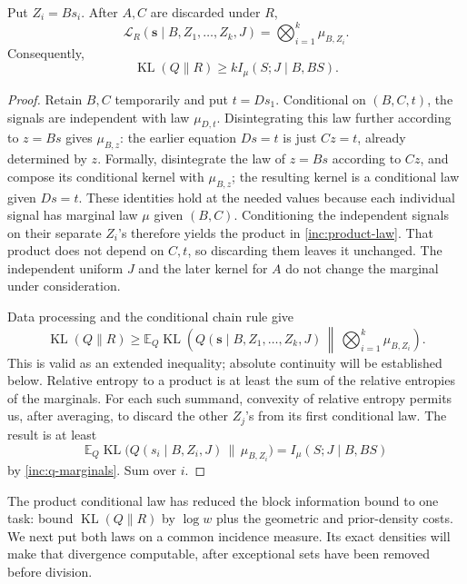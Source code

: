 \begin{lemma}\label{inc:product}
Put \(Z_i=Bs_i\).  After \(A,C\) are discarded under \(R\),
\begin{equation}\label{inc:product-law}
 \mathcal L_R(\mathbf s\mid B,Z_1,\ldots,Z_k,J)
 =\bigotimes_{i=1}^k\mu_{B,Z_i}.
\end{equation}
Consequently,
\begin{equation}\label{inc:entropy-lower}
 \operatorname{KL}(Q\|R)\ge kI_\mu(S;J\mid B,BS).
\end{equation}
\end{lemma}

\begin{proof}
Retain \(B,C\) temporarily and put \(t=Ds_1\).  Conditional on
\((B,C,t)\), the signals are independent with law \(\mu_{D,t}\).
Disintegrating this law further according to \(z=Bs\) gives
\(\mu_{B,z}\): the earlier equation \(Ds=t\) is just \(Cz=t\),
already determined by \(z\).  Formally, disintegrate the law
of \(z=Bs\) according to \(Cz\), and compose its conditional kernel
with \(\mu_{B,z}\); the resulting kernel is a conditional law given
\(Ds=t\).  These identities hold at the needed values because each
individual signal has marginal law \(\mu\) given \((B,C)\).
Conditioning the independent signals on their separate \(Z_i\)'s
therefore yields the product in \eqref{inc:product-law}.  That product
does not depend on \(C,t\), so discarding them leaves it unchanged.
The independent uniform \(J\) and the later kernel for \(A\) do not
change the marginal under consideration.

Data processing and the conditional chain rule give
\[
 \operatorname{KL}(Q\|R)\ge
 \mathbb E_Q\operatorname{KL}\!\left(
 Q(\mathbf s\mid B,Z_1,\ldots,Z_k,J)
 \,\middle\|\,\bigotimes_{i=1}^k\mu_{B,Z_i}\right).
\]
This is valid as an extended inequality; absolute continuity will be
established below.  Relative entropy to a product is at least the sum
of the relative entropies of the marginals.  For each such summand,
convexity of relative entropy permits us, after averaging, to discard
the other \(Z_j\)'s from its first conditional law.  The result is at
least
\[
 \mathbb E_Q\operatorname{KL}\bigl(
 Q(s_i\mid B,Z_i,J)\,\|\,\mu_{B,Z_i}\bigr)
 =I_\mu(S;J\mid B,BS)
\]
by \eqref{inc:q-marginals}.  Sum over \(i\).
\end{proof}

The product conditional law has reduced the block information bound to
one task: bound \(\operatorname{KL}(Q\|R)\) by \(\log w\) plus the
geometric and prior-density costs.  We next put both laws on a common
incidence measure.  Its exact densities will make that divergence
computable, after exceptional sets have been removed before division.

